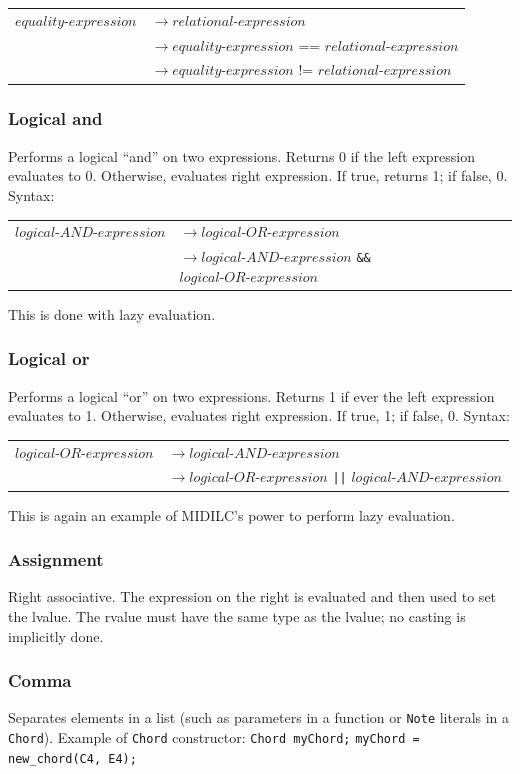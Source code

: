\documentclass[12pt,A4]{book}
\begin{document}
\begin{tabular}{l l}
$equality\mbox{-}expression$  & $\rightarrow relational\mbox{-}expression$\\
& $\rightarrow equality\mbox{-}expression$ == $relational\mbox{-}expression$\\
& $\rightarrow equality\mbox{-}expression$ != $relational\mbox{-}expression$\\
\end{tabular}

\subsubsection{Logical and}
Performs a logical ``and'' on two expressions. Returns 0 if the left expression evaluates to 0. Otherwise, evaluates right expression. If true, returns 1; if false, 0.
Syntax:

\begin{tabular}{l l}
$logical\mbox{-}AND\mbox{-}expression$  & $\rightarrow logical\mbox{-}OR\mbox{-}expression$\\
& $\rightarrow logical\mbox{-}AND\mbox{-}expression$ \verb|&&| $logical\mbox{-}OR\mbox{-}expression$
\end{tabular}

This is done with lazy evaluation.
\subsubsection{Logical or}
Performs a logical ``or'' on two expressions. Returns 1 if ever the left expression evaluates to 1. Otherwise, evaluates right expression. If true, 1; if false, 0.
Syntax:

\begin{tabular}{l l}
$logical\mbox{-}OR\mbox{-}expression$  & $\rightarrow logical\mbox{-}AND\mbox{-}expression$\\
& $\rightarrow logical\mbox{-}OR\mbox{-}expression $ \verb.||. $ logical\mbox{-}AND\mbox{-}expression$
\end{tabular}

This is again an example of MIDILC’s power to perform lazy evaluation.
\subsubsection{Assignment}
Right associative. The expression on the right is evaluated and then used to set the lvalue. The rvalue must have the same type as the lvalue; no casting is implicitly done.
\subsubsection{Comma}
Separates elements in a list (such as parameters in a function or \verb|Note| literals in a \verb|Chord|). Example of \verb|Chord| constructor:
\verb|Chord myChord;| \verb|myChord = new_chord(C4, E4);|
\end{document}
